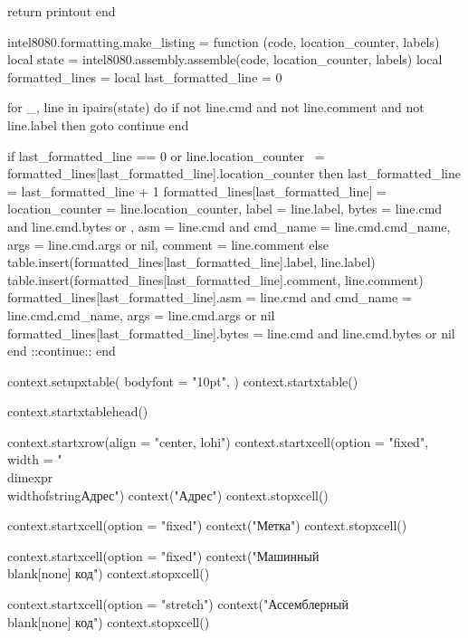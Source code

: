     return printout
end

intel8080.formatting.make_listing = function (code, location_counter, labels)
    local state = intel8080.assembly.assemble(code, location_counter, labels)
    local formatted_lines = {}
    local last_formatted_line = 0

    for _, line in ipairs(state) do
        if not line.cmd and not line.comment and not line.label then
            goto continue
        end

        if last_formatted_line == 0 or line.location_counter ~= formatted_lines[last_formatted_line].location_counter then
            last_formatted_line = last_formatted_line + 1
            formatted_lines[last_formatted_line] = {
                location_counter = line.location_counter,
                label = {line.label},
                bytes = line.cmd and line.cmd.bytes or {},
                asm = line.cmd and {cmd_name = line.cmd.cmd_name, args = line.cmd.args} or nil,
                comment = {line.comment}
            }
        else
            table.insert(formatted_lines[last_formatted_line].label, line.label)
            table.insert(formatted_lines[last_formatted_line].comment, line.comment)
            formatted_lines[last_formatted_line].asm = line.cmd and {cmd_name = line.cmd.cmd_name, args = line.cmd.args} or nil
            formatted_lines[last_formatted_line].bytes = line.cmd and line.cmd.bytes or nil
        end
        ::continue::
    end

    context.setupxtable({
        bodyfont = "10pt",
    })
    context.startxtable()

    context.startxtablehead()

    context.startxrow({align = "center, lohi"})
        context.startxcell({option = "fixed", width = "\\dimexpr\\widthofstring{Адрес}"})
            context("Адрес")
        context.stopxcell()

        context.startxcell({option = "fixed"})
            context("Метка")
        context.stopxcell()

        context.startxcell({option = "fixed"})
            context("Машинный\\blank[none] код")
        context.stopxcell()

        context.startxcell({option = "stretch"})
            context("Ассемблерный\\blank[none] код")
        context.stopxcell()

